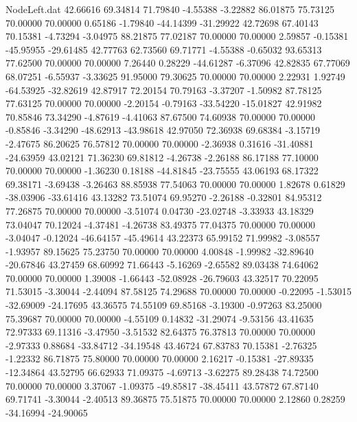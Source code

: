 \begin{filecontents}{NodeLeft.dat}
  42.66616   69.34814   71.79840    -4.55388   -3.22882   86.01875   75.73125   70.00000   70.00000    0.65186   -1.79840  -44.14399  -31.29922
  42.72698   67.40143   70.15381    -4.73294   -3.04975   88.21875   77.02187   70.00000   70.00000    2.59857   -0.15381  -45.95955  -29.61485
  42.77763   62.73560   69.71771    -4.55388   -0.65032   93.65313   77.62500   70.00000   70.00000    7.26440    0.28229  -44.61287   -6.37096
  42.82835   67.77069   68.07251    -6.55937   -3.33625   91.95000   79.30625   70.00000   70.00000    2.22931    1.92749  -64.53925  -32.82619
  42.87917   72.20154   70.79163    -3.37207   -1.50982   87.78125   77.63125   70.00000   70.00000   -2.20154   -0.79163  -33.54220  -15.01827
  42.91982   70.85846   73.34290    -4.87619   -4.41063   87.67500   74.60938   70.00000   70.00000   -0.85846   -3.34290  -48.62913  -43.98618
  42.97050   72.36938   69.68384    -3.15719   -2.47675   86.20625   76.57812   70.00000   70.00000   -2.36938    0.31616  -31.40881  -24.63959
  43.02121   71.36230   69.81812    -4.26738   -2.26188   86.17188   77.10000   70.00000   70.00000   -1.36230    0.18188  -44.81845  -23.75555
  43.06193   68.17322   69.38171    -3.69438   -3.26463   88.85938   77.54063   70.00000   70.00000    1.82678    0.61829  -38.03906  -33.61416
  43.13282   73.51074   69.95270    -2.26188   -0.32801   84.95312   77.26875   70.00000   70.00000   -3.51074    0.04730  -23.02748   -3.33933
  43.18329   73.04047   70.12024    -4.37481   -4.26738   83.49375   77.04375   70.00000   70.00000   -3.04047   -0.12024  -46.64157  -45.49614
  43.22373   65.99152   71.99982    -3.08557   -1.93957   89.15625   75.23750   70.00000   70.00000    4.00848   -1.99982  -32.89640  -20.67846
  43.27459   68.60992   71.66443    -5.16269   -2.65582   89.03438   74.64062   70.00000   70.00000    1.39008   -1.66443  -52.08928  -26.79603
  43.32517   70.22095   71.53015    -3.30044   -2.44094   87.58125   74.29688   70.00000   70.00000   -0.22095   -1.53015  -32.69009  -24.17695
  43.36575   74.55109   69.85168    -3.19300   -0.97263   83.25000   75.39687   70.00000   70.00000   -4.55109    0.14832  -31.29074   -9.53156
  43.41635   72.97333   69.11316    -3.47950   -3.51532   82.64375   76.37813   70.00000   70.00000   -2.97333    0.88684  -33.84712  -34.19548
  43.46724   67.83783   70.15381    -2.76325   -1.22332   86.71875   75.80000   70.00000   70.00000    2.16217   -0.15381  -27.89335  -12.34864
  43.52795   66.62933   71.09375    -4.69713   -3.62275   89.28438   74.72500   70.00000   70.00000    3.37067   -1.09375  -49.85817  -38.45411
  43.57872   67.87140   69.71741    -3.30044   -2.40513   89.36875   75.51875   70.00000   70.00000    2.12860    0.28259  -34.16994  -24.90065

\end{filecontents}
